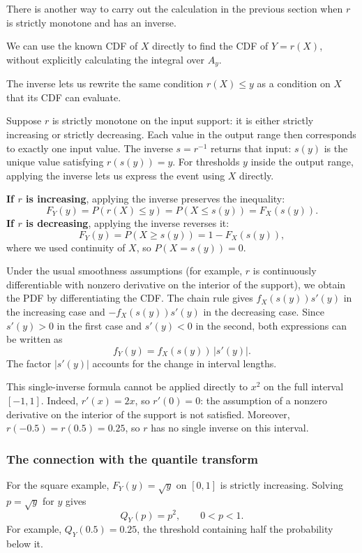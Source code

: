 \documentclass[a4paper,12pt,oneside]{report}
\begin{document}
There is another way to carry out the calculation in the
previous section when $r$ is strictly monotone and has an inverse.

We can use the known CDF of $X$ directly to find the CDF of
$Y=r(X)$, without explicitly calculating the integral over $A_y$.

The inverse lets us rewrite the same condition $r(X)\leq y$
as a condition on $X$ that its CDF can evaluate.

Suppose $r$ is strictly monotone on the input support: it is
either strictly increasing or strictly decreasing. Each value
in the output range then corresponds to exactly one input value.
The inverse $s=r^{-1}$ returns that input: $s(y)$ is the unique
value satisfying $r(s(y))=y$.
For thresholds $y$ inside the output range, applying the inverse
lets us express the event using $X$ directly.

\textbf{If $r$ is increasing}, applying the inverse preserves
the inequality:
\[
  F_Y(y)=P(r(X)\leq y)=P(X\leq s(y))=F_X(s(y)).
\]
\textbf{If $r$ is decreasing}, applying the inverse reverses it:
\[
  F_Y(y)=P(X\geq s(y))=1-F_X(s(y)),
\]
where we used continuity of $X$, so $P(X=s(y))=0$.

Under the usual smoothness assumptions (for example, $r$ is
continuously differentiable with nonzero derivative on the
interior of the support), we obtain the PDF by differentiating
the CDF. The chain rule gives $f_X(s(y))s'(y)$ in the increasing
case and $-f_X(s(y))s'(y)$ in the decreasing case.
Since $s'(y)>0$ in the first case and $s'(y)<0$ in the second,
both expressions can be written as
\[
  f_Y(y)=f_X(s(y))\,|s'(y)|.
\]
The factor $|s'(y)|$ accounts for the change in interval lengths.

\begin{framedexample}{}
This single-inverse formula cannot be applied directly to
$x^2$ on the full interval $[-1,1]$.
Indeed, $r'(x)=2x$, so $r'(0)=0$: the assumption of a nonzero
derivative on the interior of the support is not satisfied.
Moreover, $r(-0.5)=r(0.5)=0.25$, so $r$ has no single inverse
on this interval.
\end{framedexample}

\subsubsection{The connection with the quantile transform}
For the square example, $F_Y(y)=\sqrt y$ on $[0,1]$ is
strictly increasing. Solving $p=\sqrt y$ for $y$ gives
\[
  Q_Y(p)=p^2,\qquad 0<p<1.
\]
For example, $Q_Y(0.5)=0.25$, the threshold containing half
the probability below it.
\end{document}
